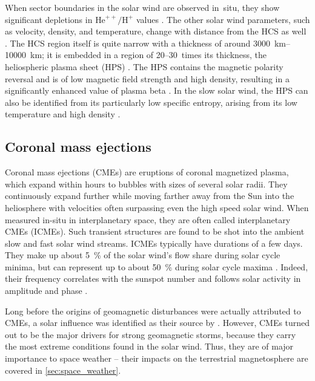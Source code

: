 When sector boundaries in the solar wind are observed in~situ, they show significant depletions in $\text{He}^{++}\!/\text{H}^+$ values \citep{Borrini1981}. The other solar wind parameters, such as velocity, density, and temperature, change with distance from the HCS as well \citep{Smith2001}. The HCS region itself is quite narrow with a thickness of around \SIrange{3000}{10000}{\km}; it is embedded in a region of 20--30~times its thickness, the heliospheric plasma sheet (HPS) \citep{Winterhalter1994}. The HPS contains the magnetic polarity reversal and is of low magnetic field strength and high density, resulting in a significantly enhanced value of plasma beta \citep{Crooker2004}. In the slow solar wind, the HPS can also be identified from its particularly low specific entropy, arising from its low temperature and high density \citep{Kilpua2016}.


\subsection{Coronal mass ejections}
\label{sec:coronal_mass_ejections}
Coronal mass ejections (CMEs) are eruptions of coronal magnetized plasma, which expand within hours to bubbles with sizes of several solar radii. They continuously expand further while moving farther away from the Sun into the heliosphere with velocities often surpassing even the high speed solar wind. When measured in-situ in interplanetary space, they are often called interplanetary CMEs (ICMEs). Such transient structures are found to be shot into the ambient slow and fast solar wind streams. ICMEs typically have durations of a few days. They make up about \SI{5}{\percent} of the solar wind's flow share during solar cycle minima, but can represent up to about \SI{50}{\percent} during solar cycle maxima \citep{Richardson2012}. Indeed, their frequency correlates with the sunspot number \citep{Hildner1976} and follows solar activity in amplitude and phase \citep{Webb1991}.

Long before the origins of geomagnetic disturbances were actually attributed to CMEs, a solar influence was identified as their source by \citet{Carrington1859}. However, CMEs turned out to be the major drivers for strong geomagnetic storms, because they carry the most extreme conditions found in the solar wind. Thus, they are of major importance to space weather -- their impacts on the terrestrial magnetosphere are covered in \autoref{sec:space_weather}.


